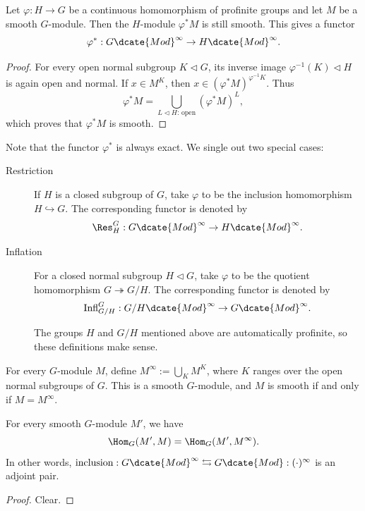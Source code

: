\begin{definition-proposition}
	Let $\varphi:H\to G$ be a continuous homomorphism of profinite groups and
	let $M$ be a smooth $G$-module. Then the $H$-module $\varphi^*M$ is still
	smooth. This gives a functor
	\[ \varphi^*:G\dcate{Mod}^\infty\to H\dcate{Mod}^\infty. \]
\end{definition-proposition}
\begin{proof}
	For every open normal subgroup $K\lhd G$, its inverse image
	$\varphi^{-1}(K)\lhd H$ is again open and normal. If $x\in M^K$, then
	$x\in(\varphi^*M)^{\varphi^{-1}K}$. Thus
	\[ \varphi^*M=
	\bigcup_{L\lhd H:\,\text{open}}(\varphi^*M)^L, \]
	which proves that $\varphi^*M$ is smooth.
\end{proof}

Note that the functor $\varphi^*$ is always exact. We single out two special
cases:
\begin{description}
	\item[Restriction] If $H$ is a closed subgroup of $G$, take $\varphi$ to
	be the inclusion homomorphism $H\hookrightarrow G$. The corresponding
	functor is denoted by
	\[ \Res^G_H:G\dcate{Mod}^\infty\to H\dcate{Mod}^\infty. \]
	\item[Inflation] For a closed normal subgroup $H\lhd G$, take $\varphi$ to
	be the quotient homomorphism $G\twoheadrightarrow G/H$. The corresponding
	functor is denoted by
	\[ \mathrm{Infl}^G_{G/H}:G/H\dcate{Mod}^\infty
	\to G\dcate{Mod}^\infty. \]

	The groups $H$ and $G/H$ mentioned above are automatically profinite, so
	these definitions make sense.
\end{description}

\begin{definition-proposition}\label{def:smooth-part}
	For every $G$-module $M$, define
	$M^\infty:=\bigcup_KM^K$, where $K$ ranges over the open normal subgroups
	of $G$. This is a smooth $G$-module, and $M$ is smooth if and only if
	$M=M^\infty$.

	For every smooth $G$-module $M'$, we have
	\[ \Hom_G(M',M)=\Hom_G(M',M^\infty). \]
	In other words,
	$\text{inclusion}:G\dcate{Mod}^\infty
	\leftrightarrows G\dcate{Mod}:(\cdot)^\infty$ is an adjoint pair.
\end{definition-proposition}
\begin{proof}
	Clear.
\end{proof}

